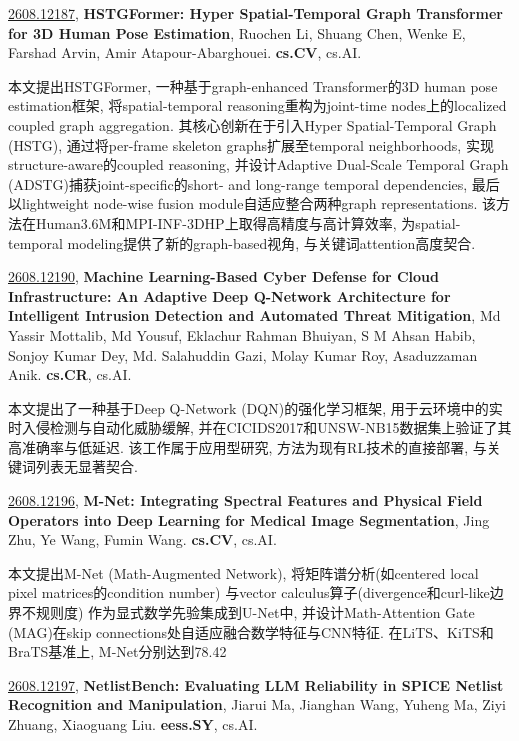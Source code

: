 \documentclass[9pt, a4paper]{article}
\theoremstyle{plain}
\theoremstyle{definition}
\theoremstyle{remark}
\newcommand{\arxivwithtarget}[3]{\hypertarget{#1}{}\href{https://arxiv.org/abs/#1}{#1}, \textbf{\textcolor{arxivblue}{#2}}, #3. }
\begin{document}
\arxivwithtarget{2608.12187}{HSTGFormer: Hyper Spatial-Temporal Graph Transformer for 3D Human Pose Estimation}{Ruochen Li, Shuang Chen, Wenke E, Farshad Arvin, Amir Atapour-Abarghouei}\textbf{cs.CV}, cs.AI.

本文提出HSTGFormer, 一种基于graph-enhanced Transformer的3D human pose estimation框架, 将spatial-temporal reasoning重构为joint-time nodes上的localized coupled graph aggregation. 其核心创新在于引入Hyper Spatial-Temporal Graph (HSTG), 通过将per-frame skeleton graphs扩展至temporal neighborhoods, 实现structure-aware的coupled reasoning, 并设计Adaptive Dual-Scale Temporal Graph (ADSTG)捕获joint-specific的short- and long-range temporal dependencies, 最后以lightweight node-wise fusion module自适应整合两种graph representations. 该方法在Human3.6M和MPI-INF-3DHP上取得高精度与高计算效率, 为spatial-temporal modeling提供了新的graph-based视角, 与关键词attention高度契合.


\arxivwithtarget{2608.12190}{Machine Learning-Based Cyber Defense for Cloud Infrastructure: An Adaptive Deep Q-Network Architecture for Intelligent Intrusion Detection and Automated Threat Mitigation}{Md Yassir Mottalib, Md Yousuf, Eklachur Rahman Bhuiyan, S M Ahsan Habib, Sonjoy Kumar Dey, Md. Salahuddin Gazi, Molay Kumar Roy, Asaduzzaman Anik}\textbf{cs.CR}, cs.AI.

本文提出了一种基于Deep Q-Network (DQN)的强化学习框架, 用于云环境中的实时入侵检测与自动化威胁缓解, 并在CICIDS2017和UNSW-NB15数据集上验证了其高准确率与低延迟. 该工作属于应用型研究, 方法为现有RL技术的直接部署, 与关键词列表无显著契合.


\arxivwithtarget{2608.12196}{M-Net: Integrating Spectral Features and Physical Field Operators into Deep Learning for Medical Image Segmentation}{Jing Zhu, Ye Wang, Fumin Wang}\textbf{cs.CV}, cs.AI.

本文提出M-Net (Math-Augmented Network), 将矩阵谱分析(如centered local pixel matrices的condition number) 与vector calculus算子(divergence和curl-like边界不规则度) 作为显式数学先验集成到U-Net中, 并设计Math-Attention Gate (MAG)在skip connections处自适应融合数学特征与CNN特征. 在LiTS、KiTS和BraTS基准上, M-Net分别达到78.42%


\arxivwithtarget{2608.12197}{NetlistBench: Evaluating LLM Reliability in SPICE Netlist Recognition and Manipulation}{Jiarui Ma, Jianghan Wang, Yuheng Ma, Ziyi Zhuang, Xiaoguang Liu}\textbf{eess.SY}, cs.AI.
\end{document}
